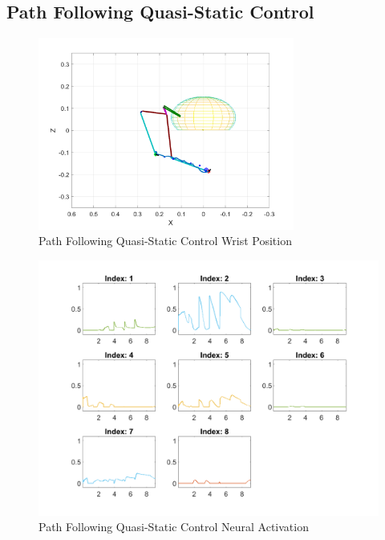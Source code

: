 \subsection{Path Following Quasi-Static Control}
\begin{figure}[h!]
\centering
\includegraphics[width=0.75\textwidth]{Pictures/Controller/Healthy_WP.png} 
\caption{Path Following Quasi-Static Control Wrist Position} %
\label{fig:PFWP} %
\end{figure}

\begin{figure}[h!]
\centering
\includegraphics[width=1\textwidth]{Pictures/Controller/Healthy_NA.png} 
\caption{Path Following Quasi-Static Control Neural Activation} %
\label{fig:PFNA} %
\end{figure}


